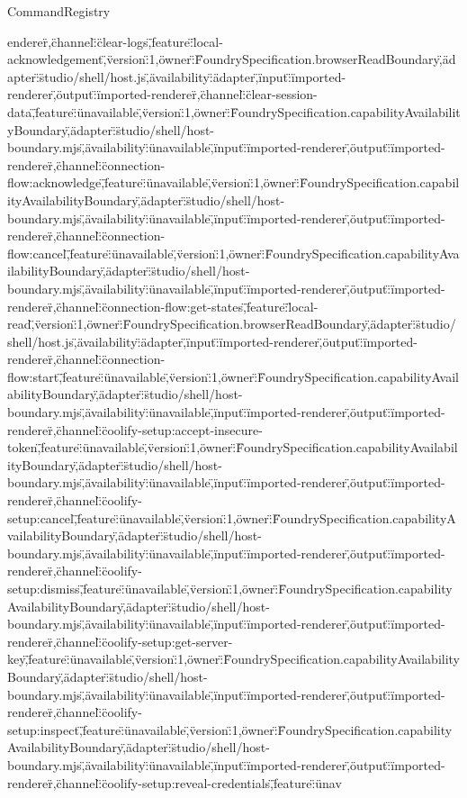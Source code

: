 \begin{lexlean}{CommandRegistry}
\begin{semanticmodule}
{enderer\"},{\"channel\":\"clear-logs\",\"feature\":\"local-acknowledgement\",\"version\":1,\"owner\":\"FoundrySpecification.browserReadBoundary\",\"adapter\":\"studio/shell/host.js\",\"availability\":\"adapter\",\"input\":\"imported-renderer\",\"output\":\"imported-renderer\"},{\"channel\":\"clear-session-data\",\"feature\":\"unavailable\",\"version\":1,\"owner\":\"FoundrySpecification.capabilityAvailabilityBoundary\",\"adapter\":\"studio/shell/host-boundary.mjs\",\"availability\":\"unavailable\",\"input\":\"imported-renderer\",\"output\":\"imported-renderer\"},{\"channel\":\"connection-flow:acknowledge\",\"feature\":\"unavailable\",\"version\":1,\"owner\":\"FoundrySpecification.capabilityAvailabilityBoundary\",\"adapter\":\"studio/shell/host-boundary.mjs\",\"availability\":\"unavailable\",\"input\":\"imported-renderer\",\"output\":\"imported-renderer\"},{\"channel\":\"connection-flow:cancel\",\"feature\":\"unavailable\",\"version\":1,\"owner\":\"FoundrySpecification.capabilityAvailabilityBoundary\",\"adapter\":\"studio/shell/host-boundary.mjs\",\"availability\":\"unavailable\",\"input\":\"imported-renderer\",\"output\":\"imported-renderer\"},{\"channel\":\"connection-flow:get-states\",\"feature\":\"local-read\",\"version\":1,\"owner\":\"FoundrySpecification.browserReadBoundary\",\"adapter\":\"studio/shell/host.js\",\"availability\":\"adapter\",\"input\":\"imported-renderer\",\"output\":\"imported-renderer\"},{\"channel\":\"connection-flow:start\",\"feature\":\"unavailable\",\"version\":1,\"owner\":\"FoundrySpecification.capabilityAvailabilityBoundary\",\"adapter\":\"studio/shell/host-boundary.mjs\",\"availability\":\"unavailable\",\"input\":\"imported-renderer\",\"output\":\"imported-renderer\"},{\"channel\":\"coolify-setup:accept-insecure-token\",\"feature\":\"unavailable\",\"version\":1,\"owner\":\"FoundrySpecification.capabilityAvailabilityBoundary\",\"adapter\":\"studio/shell/host-boundary.mjs\",\"availability\":\"unavailable\",\"input\":\"imported-renderer\",\"output\":\"imported-renderer\"},{\"channel\":\"coolify-setup:cancel\",\"feature\":\"unavailable\",\"version\":1,\"owner\":\"FoundrySpecification.capabilityAvailabilityBoundary\",\"adapter\":\"studio/shell/host-boundary.mjs\",\"availability\":\"unavailable\",\"input\":\"imported-renderer\",\"output\":\"imported-renderer\"},{\"channel\":\"coolify-setup:dismiss\",\"feature\":\"unavailable\",\"version\":1,\"owner\":\"FoundrySpecification.capabilityAvailabilityBoundary\",\"adapter\":\"studio/shell/host-boundary.mjs\",\"availability\":\"unavailable\",\"input\":\"imported-renderer\",\"output\":\"imported-renderer\"},{\"channel\":\"coolify-setup:get-server-key\",\"feature\":\"unavailable\",\"version\":1,\"owner\":\"FoundrySpecification.capabilityAvailabilityBoundary\",\"adapter\":\"studio/shell/host-boundary.mjs\",\"availability\":\"unavailable\",\"input\":\"imported-renderer\",\"output\":\"imported-renderer\"},{\"channel\":\"coolify-setup:inspect\",\"feature\":\"unavailable\",\"version\":1,\"owner\":\"FoundrySpecification.capabilityAvailabilityBoundary\",\"adapter\":\"studio/shell/host-boundary.mjs\",\"availability\":\"unavailable\",\"input\":\"imported-renderer\",\"output\":\"imported-renderer\"},{\"channel\":\"coolify-setup:reveal-credentials\",\"feature\":\"unav}
\end{semanticmodule}
\end{lexlean}
